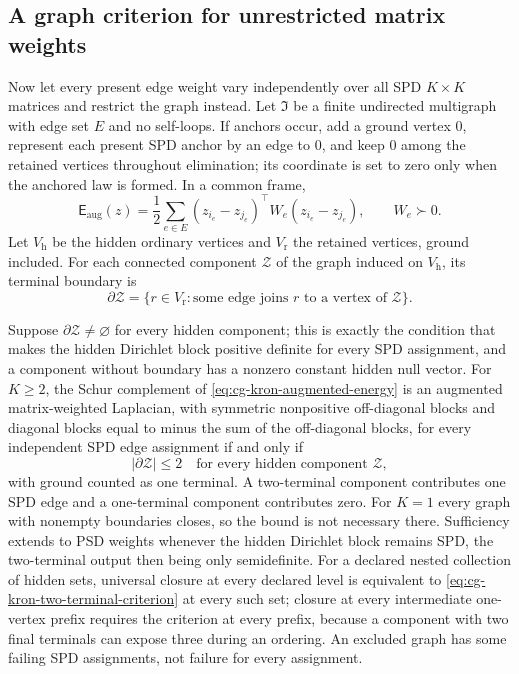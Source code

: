 \subsection{A graph criterion for unrestricted matrix weights}
\label{sec:cg-kron-graph-boundary}

Now let every present edge weight vary independently over all SPD
\(K\times K\) matrices and restrict the graph instead. Let \(\mathfrak I\) be a
finite undirected multigraph with edge set \(E\) and no self-loops. If anchors
occur, add a ground vertex \(0\), represent each present SPD anchor by an edge
to \(0\), and keep \(0\) among the retained vertices throughout elimination; its
coordinate is set to zero only when the anchored law is formed. In a common
frame,
\begin{equation}
\mathsf E_{\mathrm{aug}}(z)=
\frac12\sum_{e\in E}
(z_{i_e}-z_{j_e})^\top W_e(z_{i_e}-z_{j_e}),\qquad W_e\succ0.
\label{eq:cg-kron-augmented-energy}
\end{equation}
Let \(V_{\mathrm h}\) be the hidden ordinary vertices and \(V_{\mathrm r}\) the
retained vertices, ground included. For each connected component
\(\mathcal Z\) of the graph induced on \(V_{\mathrm h}\), its terminal boundary
is
\begin{equation}
\partial\mathcal Z=\{r\in V_{\mathrm r}:\text{some edge joins }r\text{ to a vertex of }\mathcal Z\}.
\label{eq:cg-kron-terminal-boundary}
\end{equation}

Suppose \(\partial\mathcal Z\neq\varnothing\) for every hidden component; this
is exactly the condition that makes the hidden Dirichlet block positive definite
for every SPD assignment, and a component without boundary has a nonzero
constant hidden null vector. For \(K\geq2\), the Schur complement of
\eqref{eq:cg-kron-augmented-energy} is an augmented matrix-weighted Laplacian,
with symmetric nonpositive off-diagonal blocks and diagonal blocks equal to
minus the sum of the off-diagonal blocks, for every independent SPD edge
assignment if and only if
\begin{equation}
|\partial\mathcal Z|\leq2\quad\text{for every hidden component }\mathcal Z,
\label{eq:cg-kron-two-terminal-criterion}
\end{equation}
with ground counted as one terminal. A two-terminal component contributes one
SPD edge and a one-terminal component contributes zero. For \(K=1\) every graph
with nonempty boundaries closes, so the bound is not necessary there.
Sufficiency extends to PSD weights whenever the hidden Dirichlet block remains
SPD, the two-terminal output then being only semidefinite. For a declared
nested collection of hidden sets, universal closure at every declared level is
equivalent to \eqref{eq:cg-kron-two-terminal-criterion} at every such set;
closure at every intermediate one-vertex prefix requires the criterion at every
prefix, because a component with two final terminals can expose three during an
ordering. An excluded graph has some failing SPD assignments, not failure for
every assignment. 

